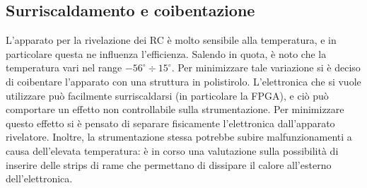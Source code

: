 \subsection{Surriscaldamento e coibentazione}
L'apparato per la rivelazione dei RC è molto sensibile alla temperatura, e in particolare questa ne influenza l'efficienza. Salendo in quota, è noto che la temperatura vari nel range $-56^{\circ} \div 15^{\circ}$. Per minimizzare tale variazione si è deciso di coibentare l'apparato con una struttura in polistirolo. L'elettronica che si vuole utilizzare può facilmente surriscaldarsi (in particolare la FPGA), e ciò può comportare un effetto non controllabile sulla strumentazione. Per minimizzare questo effetto si è pensato di separare fisicamente l'elettronica dall'apparato rivelatore. Inoltre, la strumentazione stessa potrebbe subire malfunzionamenti a causa dell'elevata temperatura: è in corso una valutazione sulla possibilità di inserire delle strips di rame che permettano di dissipare il calore all'esterno dell'elettronica.

